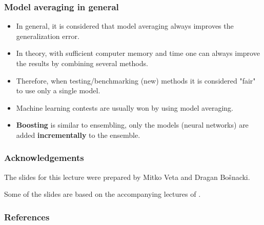 \documentclass[notes]{beamer}          %
\begin{document}
\begin{frame}
\frametitle{Model averaging in general}
    \begin{itemize}
        \item In general, it is considered that model averaging always improves the generalization error.
        \item In theory, with sufficient computer memory and time one can always improve the results by combining several methods.
        \item Therefore, when testing/benchmarking (new) methods it is considered "fair" to use only a single model.
        \item Machine learning contests are usually won by using model averaging.
        \item {\bf Boosting} is similar to ensembling, only the models (neural networks) are added {\bf incrementally} to the ensemble.
    \end{itemize}
\end{frame}

\fi

\begin{frame}
\frametitle{Acknowledgements}

The slides for this lecture were prepared by Mitko Veta and Dragan Bo{\v s}nacki.

Some of the slides are based on the accompanying lectures of \cite{deeplearning}.

\end{frame}


\begin{frame}
\frametitle{References}
\printbibliography
\end{frame}
\end{document}
